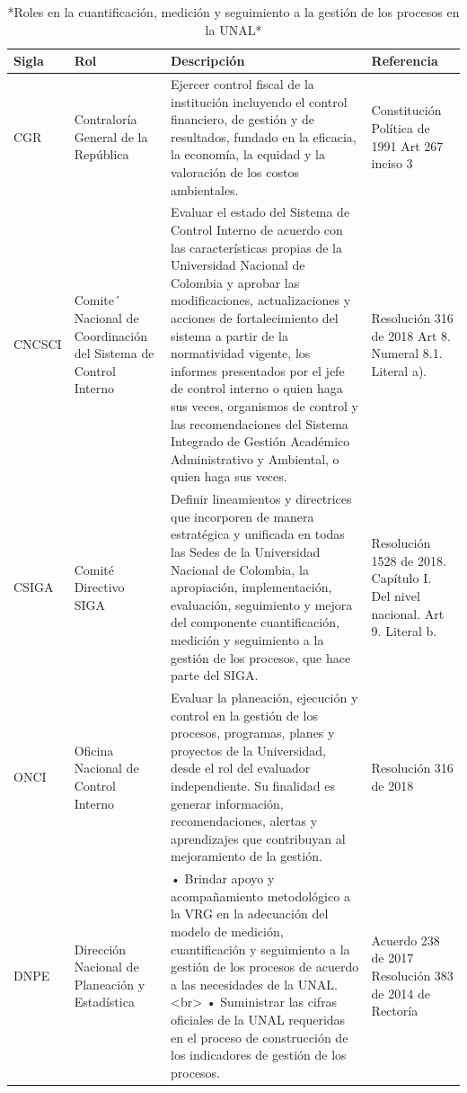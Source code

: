 \documentclass[
]{book}
\begin{document}
\begin{table}

\caption{\label{tab:tabla2}*Roles en la cuantificación, medición y seguimiento a la gestión de los procesos en la UNAL*}
\centering
\begin{tabular}[t]{l|l|l|l}
\hline
Sigla & Rol & Descripción & Referencia\\
\hline
CGR & Contraloría General de la República & Ejercer control fiscal de la institución incluyendo el control financiero, de gestión y de resultados, fundado en la eficacia, la economía, la equidad y la valoración de los costos ambientales. & Constitución Política de 1991 Art 267 inciso 3\\
\hline
CNCSCI & Comite´ Nacional de Coordinación del Sistema de Control Interno & Evaluar el estado del Sistema de Control Interno de acuerdo con las características propias de la Universidad Nacional de Colombia y aprobar las modificaciones, actualizaciones y acciones de fortalecimiento del sistema a partir de la normatividad vigente, los informes presentados por el jefe de control interno o quien haga sus veces, organismos de control y las recomendaciones del Sistema Integrado de Gestión Académico Administrativo y Ambiental, o quien haga sus veces. & Resolución 316 de 2018 Art 8. Numeral 8.1. Literal a).\\
\hline
CSIGA & Comité Directivo SIGA & Definir lineamientos y directrices que incorporen de manera estratégica y unificada en todas las Sedes de la Universidad Nacional de Colombia, la apropiación, implementación, evaluación, seguimiento y mejora del  componente cuantificación, medición y seguimiento  a la gestión de los procesos, que hace parte del SIGA. & Resolución 1528 de 2018. Capítulo I. Del nivel nacional. Art 9. Literal b.\\
\hline
ONCI & Oficina Nacional de Control Interno & Evaluar la planeación, ejecución y control en la gestión de los procesos, programas, planes y proyectos de la Universidad, desde el rol del evaluador independiente. Su finalidad es generar información, recomendaciones, alertas y aprendizajes que contribuyan al mejoramiento de la gestión. & Resolución 316 de 2018\\
\hline
DNPE & Dirección Nacional de Planeación y Estadística & • Brindar apoyo y acompañamiento metodológico a la VRG en la adecuación del modelo de medición, cuantificación y seguimiento a la gestión de los procesos de acuerdo a las necesidades de la UNAL. <br> •   Suministrar las cifras oficiales de la UNAL requeridas en el proceso de construcción de los indicadores de gestión de los procesos. & Acuerdo 238 de 2017 Resolución 383 de 2014 de Rectoría\\

\end{tabular}
\end{table}
\end{document}
